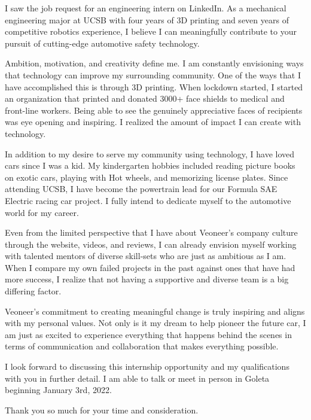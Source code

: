 \documentclass[11pt, letterpaper]{awesome-cv} %
\begin{document}
\makecvheader %

\makelettertitle %


\begin{cvletter}


I saw the job request for an engineering intern on LinkedIn. As a mechanical engineering major at UCSB with four years of 3D printing and seven years of competitive robotics experience, I believe I can meaningfully contribute to your pursuit of cutting-edge automotive safety technology.


Ambition, motivation, and creativity define me. I am constantly envisioning ways that technology can improve my surrounding community. One of the ways that I have accomplished this is through 3D printing. When lockdown started, I started an organization that printed and donated 3000+ face shields to medical and front-line workers. Being able to see the genuinely appreciative faces of recipients was eye opening and inspiring. I realized the amount of impact I can create with technology.


In addition to my desire to serve my community using technology, I have loved cars since I was a kid. My kindergarten hobbies included reading picture books on exotic cars, playing with Hot wheels, and memorizing license plates. Since attending UCSB, I have become the powertrain lead for our Formula SAE Electric racing car project. I fully intend to dedicate myself to the automotive world for my career.


Even from the limited perspective that I have about Veoneer's company culture through the website, videos, and reviews, I can already envision myself working with talented mentors of diverse skill-sets who are just as ambitious as I am. When I compare my own failed projects in the past against ones that have had more success, I realize that not having a supportive and diverse team is a big differing factor. 

Veoneer's commitment to creating meaningful change is truly inspiring and aligns with my personal values. Not only is it my dream to help pioneer the future car, I am just as excited to experience everything that happens behind the scenes in terms of communication and collaboration that makes everything possible.

I look forward to discussing this internship opportunity and my qualifications with you in further detail. I am able to talk or meet in person in Goleta beginning January 3rd, 2022. 

Thank you so much for your time and consideration.


\end{cvletter}


\makeletterclosing %
\end{document}
